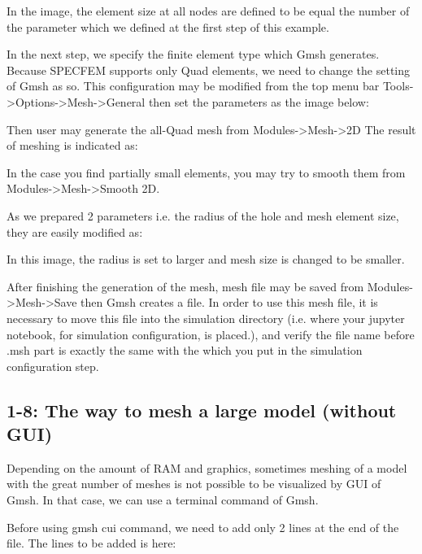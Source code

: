 \documentclass[letterpaper,10pt,english]{sphinxmanual}
\begin{document}
In the image, the element size at all nodes are defined to be equal the number of the parameter  which we defined at the first step of this example.

In the next step, we specify the finite element type which Gmsh generates. Because SPECFEM supports only Quad elements, we need to change the setting of Gmsh as so.
This configuration may be modified from the top menu bar Tools-\textgreater{}Options-\textgreater{}Mesh-\textgreater{}General then set the parameters as the image below:



Then user may generate the all-Quad mesh from Modules-\textgreater{}Mesh-\textgreater{}2D
The result of meshing is indicated as:



In the case you find partially small elements, you may try to smooth them from Modules-\textgreater{}Mesh-\textgreater{}Smooth 2D.

As we prepared 2 parameters i.e. the radius of the hole and mesh element size, they are easily modified as:



In this image, the radius is set to larger and mesh size is changed to be smaller.

After finishing the generation of the mesh, mesh file may be saved from Modules-\textgreater{}Mesh-\textgreater{}Save then Gmsh creates a  file.
In order to use this mesh file, it is necessary to move this file into the simulation directory (i.e. where your jupyter notebook, for simulation configuration, is placed.), and verify the file name before .msh part is exactly the same with the  which you put in the simulation configuration step.


\subsection{1-8: The way to mesh a large model (without GUI)}
\label{\detokenize{meshing:the-way-to-mesh-a-large-model-without-gui}}
Depending on the amount of RAM and graphics, sometimes meshing of a model with the great number of meshes is not possible to be visualized by GUI of Gmsh. In that case, we can use a terminal command of Gmsh.

Before using gmsh cui command, we need to add only 2 lines at the end of the  file.
The lines to be added is here:
\end{document}

